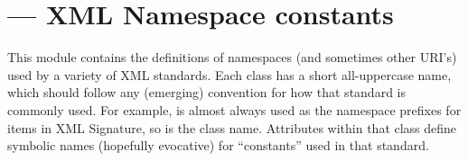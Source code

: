 \documentclass{howto}
\begin{document}



\section{ ---
         XML Namespace constants}


This module contains the definitions of namespaces (and sometimes
other URI's) used by a variety of XML standards.  Each class has a
short all-uppercase name, which should follow any (emerging)
convention for how that standard is commonly used.  For example,
 is almost always used as the namespace prefixes for items in
XML Signature, so  is the class name.  Attributes within that
class define symbolic names (hopefully evocative) for ``constants''
used in that standard.
\end{document}
